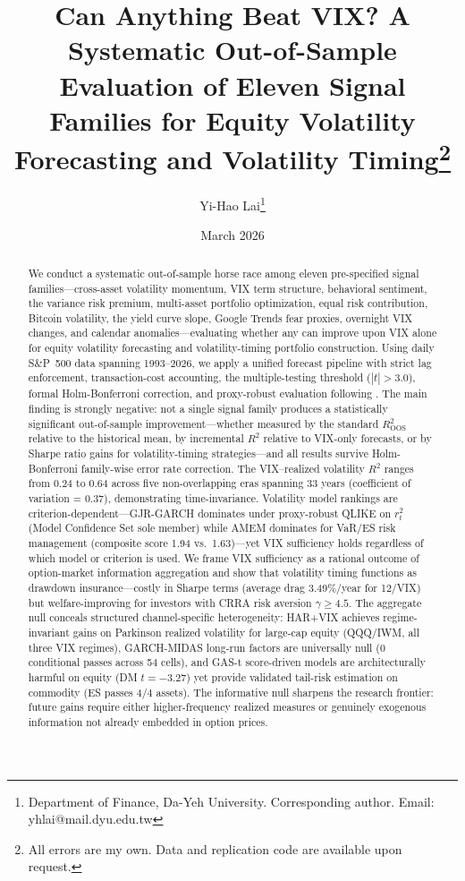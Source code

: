 \documentclass[12pt,a4paper]{article}
\title{Can Anything Beat VIX? A Systematic Out-of-Sample Evaluation of Eleven Signal Families for Equity Volatility Forecasting and Volatility Timing\thanks{All errors are my own. Data and replication code are available upon request.}}
\author{Yi-Hao Lai\thanks{Department of Finance, Da-Yeh University. Corresponding author. Email: yhlai@mail.dyu.edu.tw}}
\date{March 2026}
\begin{document}
\maketitle

\begin{abstract}
\noindent
We conduct a systematic out-of-sample horse race among eleven pre-specified signal families---cross-asset volatility momentum, VIX term structure, behavioral sentiment, the variance risk premium, multi-asset portfolio optimization, equal risk contribution, Bitcoin volatility, the yield curve slope, Google Trends fear proxies, overnight VIX changes, and calendar anomalies---evaluating whether any can improve upon VIX alone for equity volatility forecasting and volatility-timing portfolio construction. Using daily S\&P~500 data spanning 1993--2026, we apply a unified forecast pipeline with strict lag enforcement, transaction-cost accounting, the \citet{harvey2016} multiple-testing threshold ($|t|>3.0$), formal Holm-Bonferroni correction, and proxy-robust evaluation following \citet{patton2011}. The main finding is strongly negative: not a single signal family produces a statistically significant out-of-sample improvement---whether measured by the standard \citet{campbell2008} $R^2_{\text{OOS}}$ relative to the historical mean, by incremental $R^2$ relative to VIX-only forecasts, or by Sharpe ratio gains for volatility-timing strategies---and all results survive Holm-Bonferroni family-wise error rate correction. The VIX--realized volatility $R^2$ ranges from 0.24 to 0.64 across five non-overlapping eras spanning 33 years (coefficient of variation = 0.37), demonstrating time-invariance. Volatility model rankings are criterion-dependent---GJR-GARCH dominates under proxy-robust QLIKE on $r_t^2$ (Model Confidence Set sole member) while AMEM dominates for VaR/ES risk management (composite score 1.94 vs.\ 1.63)---yet VIX sufficiency holds regardless of which model or criterion is used. We frame VIX sufficiency as a rational outcome of option-market information aggregation and show that volatility timing functions as drawdown insurance---costly in Sharpe terms (average drag 3.49\%/year for 12/VIX) but welfare-improving for investors with CRRA risk aversion $\gamma \geq 4.5$. The aggregate null conceals structured channel-specific heterogeneity: HAR+VIX achieves regime-invariant gains on Parkinson realized volatility for large-cap equity (QQQ/IWM, all three VIX regimes), GARCH-MIDAS long-run factors are universally null (0 conditional passes across 54 cells), and GAS-t score-driven models are architecturally harmful on equity (DM $t=-3.27$) yet provide validated tail-risk estimation on commodity (ES passes 4/4 assets). The informative null sharpens the research frontier: future gains require either higher-frequency realized measures or genuinely exogenous information not already embedded in option prices.


\end{abstract}
\end{document}
